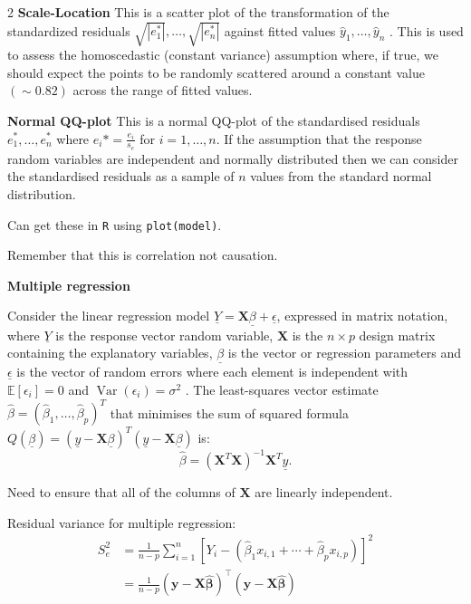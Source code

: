 \documentclass[10pt]{extarticle}
\theoremstyle{definition}
\theoremstyle{remark}
\newcommand{\E}{\mathbb{E}}
\DeclareMathOperator{\Var}{Var}
\begin{document}
\begin{multicols}{2}
    \textbf{Scale-Location}
    This is a scatter plot of the transformation of the standardized residuals
    $\sqrt{|e_1^*|}, \ldots , \sqrt{|e_n^*|} $ against fitted values $\hat{y}_1 ,
    \ldots , \hat{y}_n$ . This is
    used to assess the homoscedastic (constant variance) assumption where, if
    true, we should expect the points to be randomly scattered around a
    constant value $(\sim 0.82)$ across the range of fitted values.

    \textbf{Normal QQ-plot}
    This is a normal QQ-plot of the standardised residuals$e_1^* , \ldots , e_n^*$ 
    where $e_i* = \frac{e_i}{s_e}$ for $i = 1, \ldots , n$. If the assumption that the
    response random variables are independent and normally distributed then we
    can consider the standardised residuals as a sample of $n$ values from the
    standard normal distribution.

    Can get these in \verb|R| using \verb|plot(model)|.

    Remember that this is correlation not causation. 

    \noindent 
    {\large\textbf{Multiple regression}}

    Consider the linear regression model $\underline{Y} = \mathbf{X}
    \underline{\beta}+ \underline{\epsilon}$, expressed in matrix notation,
    where $\underline{Y}$ is the response vector random variable, $\mathbf{X}$
    is the $n \times p$ design
    matrix containing the explanatory variables,
    $\underline{\beta}$ is the vector or regression parameters and
    $\underline{\epsilon}$ is the vector of
    random errors where each element is
    independent with $\E [\epsilon_i ] = 0$ and $\Var (\epsilon_i ) = \sigma^2$
    . The least-squares vector estimate $\hat{\beta} = (\hat{\beta}_1 , \ldots
    , \hat{\beta}_p )^T$ that
    minimises the sum of squared formula $Q(\underline{\beta}) = (\underline{y}
    - \mathbf{X} \underline{\beta})^T (\underline{y} - \mathbf{X} \underline{\beta})$ is:
    \[ \hat{\beta} = (\mathbf{X}^T \mathbf{X} )^{-1} \mathbf{X}^T \underline{y}. \]

    Need to ensure that all of the columns of $\mathbf{X}$ are linearly
    independent.

    Residual variance for multiple regression:
    \begin{align*}
        S_e^2 &= \frac{1}{n-p} \sum_{i=1}^n \left[Y_i - (\hat{\beta}_1 x_{i,1} + \cdots + \hat{\beta}_p x_{i,p})\right]^2 \\
        &= \frac{1}{n-p}(\mathbf{y} - \mathbf{X}\hat{\boldsymbol{\beta}})^\top(\mathbf{y} - \mathbf{X}\hat{\boldsymbol{\beta}}) \\
    \end{align*}


\end{multicols}
\end{document}
